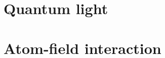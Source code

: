 \documentclass[letterpaper,11pt,openany]{book}
\begin{document}
\nocite{*}
%
%

\setcounter{tocdepth}{1}
\tableofcontents
\blankintpage
\pagestyle{mainstyle}
\part{Quantum light}



\part{Atom-field interaction}

\blankintpage
\appendix
\printindex
%
\end{document}
